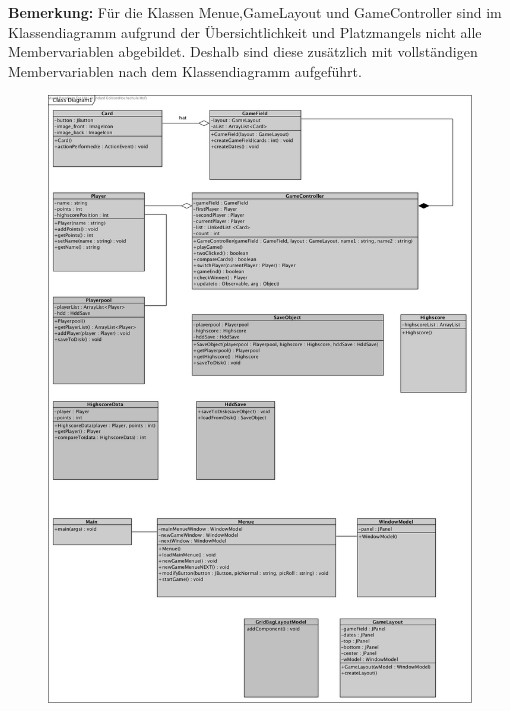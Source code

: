 \textbf{Bemerkung: }Für die Klassen Menue,GameLayout und GameController sind im Klassendiagramm aufgrund der Übersichtlichkeit und Platzmangels nicht alle Membervariablen abgebildet. Deshalb sind diese zusätzlich mit vollständigen Membervariablen nach dem Klassendiagramm aufgeführt.
    
 
\begin{figure}[!h]
	\centering
    \includegraphics[width=\textwidth]{./Klassendiagramm.png}
	\label{layout_gesamt}
\end{figure}

